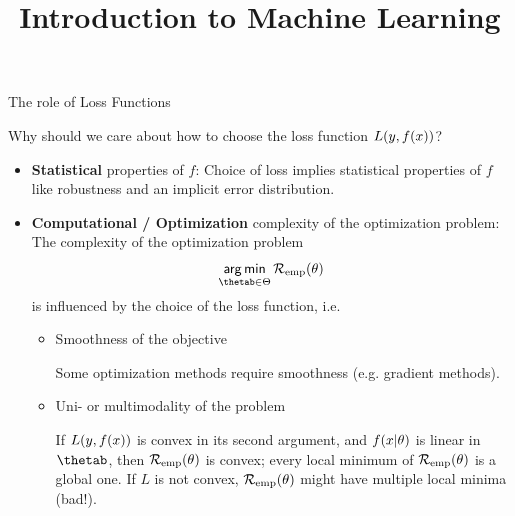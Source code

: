




\newcommand{\titlefigure}{figure_man/optimization_steps.jpeg}
\newcommand{\learninggoals}{
  \item Understand why the choice of the loss function matters
  \item Know some advanced loss functions
}

\title{Introduction to Machine Learning}
\date{}






\begin{vbframe}{The role of Loss Functions}

Why should we care about how to choose the loss function $L(y, f(x))$?

\begin{itemize}
\item \textbf{Statistical} properties of $f$: Choice of loss implies statistical properties of $f$ like robustness and an implicit error distribution.
\item \textbf{Computational / Optimization} complexity of the optimization problem: The complexity of the optimization problem
$$
\argmin_{\thetab \in \Theta} \risket
$$
is influenced by the choice of the loss function, i.e.\

  \begin{itemize}
    \item Smoothness of the objective \\
    \begin{footnotesize} 
    Some optimization methods require smoothness (e.g. gradient methods).
    \end{footnotesize}
    \item Uni- or multimodality of the problem \\
    \begin{footnotesize} 
    If $L(y, f(x))$ is convex in its second argument, and $f(x | \theta)$ is linear in $\thetab$, then $\mathcal{R}_{\text{emp}}(\theta)$ is convex; every local minimum of $\mathcal{R}_{\text{emp}}(\theta)$ is a global one. If $L$ is not convex, $\mathcal{R}_{\text{emp}}(\theta)$ might have multiple local minima (bad!).
    \end{footnotesize}
  \end{itemize}
\end{itemize}


\end{vbframe}





